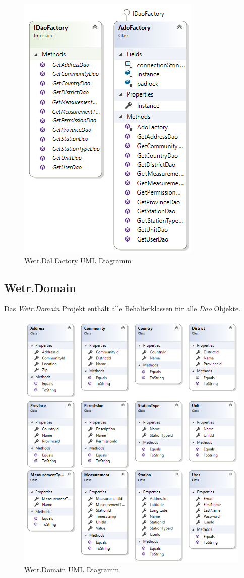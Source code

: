 \begin{figure}[H]
\centering
\includegraphics[width=.45\textwidth]{pictures/Wetr_Dal_Factory.png}
\caption{Wetr.Dal.Factory UML Diagramm}
\label{fig:Wetr.Dal.Factory}
\end{figure}
\raggedright

\newpage
\subsection{Wetr.Domain}
Das \textit{Wetr.Domain} Projekt enthält alle Behälterklassen für alle \textit{Dao} Objekte.

\begin{figure}[H]
\centering
\includegraphics[width=.8\textwidth]{pictures/Wetr_Domain.png}
\caption{Wetr.Domain UML Diagramm}
\label{fig:Wetr.Domain}
\end{figure}
\raggedright

